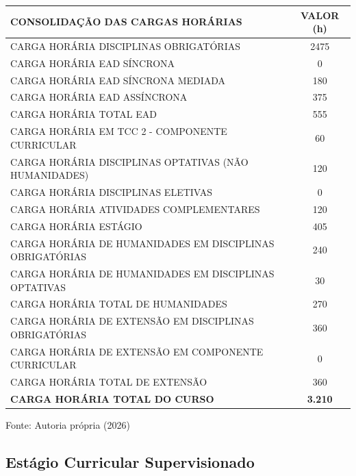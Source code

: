 \begin{quadro}[htb]
    \centering
    \caption{Consolidação da carga horária total do curso}
    \label{quadro:2.9}
    \begin{tabular}{|l|c|}
        \hline
        \rowcolor{gray!10} \textbf{CONSOLIDAÇÃO DAS CARGAS HORÁRIAS} & \textbf{VALOR (h)} \\ \hline
        CARGA HORÁRIA DISCIPLINAS OBRIGATÓRIAS & 2475 \\ \hline
        CARGA HORÁRIA EAD SÍNCRONA & 0 \\ \hline
        CARGA HORÁRIA EAD SÍNCRONA MEDIADA & 180 \\ \hline
        CARGA HORÁRIA EAD ASSÍNCRONA & 375 \\ \hline
        CARGA HORÁRIA TOTAL EAD & 555 \\ \hline
        CARGA HORÁRIA EM TCC 2 - COMPONENTE CURRICULAR & 60 \\ \hline
        CARGA HORÁRIA DISCIPLINAS OPTATIVAS (NÃO HUMANIDADES) & 120 \\ \hline
        CARGA HORÁRIA DISCIPLINAS ELETIVAS & 0 \\ \hline
        CARGA HORÁRIA ATIVIDADES COMPLEMENTARES & 120 \\ \hline
        CARGA HORÁRIA ESTÁGIO & 405 \\ \hline
        CARGA HORÁRIA DE HUMANIDADES EM DISCIPLINAS OBRIGATÓRIAS & 240 \\ \hline
        CARGA HORÁRIA DE HUMANIDADES EM DISCIPLINAS OPTATIVAS & 30 \\ \hline
        CARGA HORÁRIA TOTAL DE HUMANIDADES & 270 \\ \hline
        CARGA HORÁRIA DE EXTENSÃO EM DISCIPLINAS OBRIGATÓRIAS & 360 \\ \hline
        CARGA HORÁRIA DE EXTENSÃO EM COMPONENTE CURRICULAR & 0 \\ \hline
        CARGA HORÁRIA TOTAL DE EXTENSÃO & 360 \\ \hline
        \rowcolor{gray!20} \textbf{CARGA HORÁRIA TOTAL DO CURSO} & \textbf{3.210} \\ \hline
    \end{tabular}
    \par\vspace{2pt}
    \footnotesize{Fonte: Autoria própria (2026)}
\end{quadro}

\subsection{Estágio Curricular Supervisionado}

